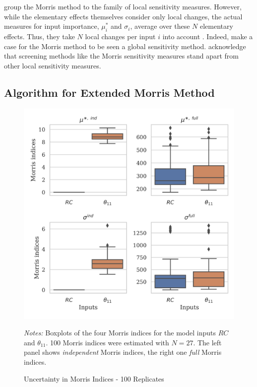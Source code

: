 \citet{BP16} group the Morris method to the family of local sensitivity measures. However, while the elementary effects themselves consider only local changes, the actual measures for input importance, $\mu_i^\ast$ and $\sigma_i$, average over these $N$ elementary effects. Thus, they take $N$ local changes per input $i$ into account \citep{M91}. Indeed, \citet{CCS11} make a case for the Morris method to be seen a global sensitivity method. \citet{BP16} acknowledge that screening methods like the Morris sensitivity measures stand apart from other local sensitivity measures.

\subsection{Algorithm for Extended Morris Method}

\begin{figure}[t]
	\caption{Uncertainty in Morris Indices - 100 Replicates}
    \label{morris_replicates}
    \begin{centering}
	\vspace*{-4mm}
	\begin{centering}
	\includegraphics[scale=0.9]{../figures/boxplot_morris_replicates_100_replicates_27_draws.png}
    \end{centering}
    \end{centering}

    \small
    \textit{Notes:} Boxplots of the four Morris indices for the model inputs $RC$ and $\theta_{11}$. 100 Morris indices were estimated with $N=27$. The left panel shows \textit{independent} Morris indices, the right one \textit{full} Morris indices.
\end{figure}

